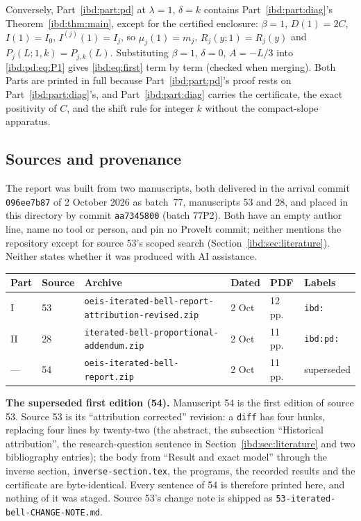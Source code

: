\documentclass[11pt,letterpaper]{article}
\theoremstyle{remark}\newtheorem{remark}[theorem]{Remark}
\begin{document}
Conversely, Part~\ref{ibd:part:pd} at $\lambda=1$, $\delta=k$ contains Part~\ref{ibd:part:diag}'s Theorem~\ref{ibd:thm:main}, except for the certified enclosure: $\beta=1$, $D(1)=2C$, $I(1)=I_0$, $I^{(j)}(1)=I_j$, so $\mu_j(1)=m_j$, $R_j(y;1)=R_j(y)$ and $P_j(L;1,k)=P_{j,k}(L)$. Substituting $\beta=1$, $\delta=0$, $A=-L/3$ into \eqref{ibd:pd:eq:P1} gives \eqref{ibd:eq:first} term by term (checked when merging). Both Parts are printed in full because Part~\ref{ibd:part:pd}'s proof rests on Part~\ref{ibd:part:diag}'s, and Part~\ref{ibd:part:diag} carries the certificate, the exact positivity of $C$, and the shift rule for integer $k$ without the compact-slope apparatus.

\subsection*{Sources and provenance}
\label{ibd:guide:provenance}
The report was built from two manuscripts, both delivered in the arrival commit \texttt{096ee7b87} of 2 October 2026 as batch~77, manuscripts 53 and 28, and placed in this directory by commit \texttt{aa7345800} (batch 77P2). Both have an empty author line, name no tool or person, and pin no ProveIt commit; neither mentions the repository except for source 53's scoped search (Section~\ref{ibd:sec:literature}). Neither states whether it was produced with AI assistance.

\begin{center}
\footnotesize\setlength{\tabcolsep}{4pt}
\begin{tabular}{@{}llllll@{}}
\toprule
Part & Source & Archive & Dated & PDF & Labels\\
\midrule
I & 53 & \texttt{oeis-iterated-bell-report-attribution-revised.zip} & 2 Oct & 12 pp. & \texttt{ibd:}\\
II & 28 & \texttt{iterated-bell-proportional-addendum.zip} & 2 Oct & 11 pp. & \texttt{ibd:pd:}\\
--- & 54 & \texttt{oeis-iterated-bell-report.zip} & 2 Oct & 11 pp. & superseded\\
\bottomrule
\end{tabular}

\end{center}

\noindent\textbf{The superseded first edition (54).} Manuscript 54 is the first edition of source 53. Source 53 is its ``attribution corrected'' revision: a \texttt{diff} has four hunks, replacing four lines by twenty-two (the abstract, the subsection ``Historical attribution'', the research-question sentence in Section~\ref{ibd:sec:literature} and two bibliography entries); the body from ``Result and exact model'' through the inverse section, \texttt{inverse-section.tex}, the programs, the recorded results and the certificate are byte-identical. Every sentence of 54 is therefore printed here, and nothing of it was staged. Source 53's change note is shipped as \texttt{53-iterated-bell-CHANGE-NOTE.md}.
\end{document}
